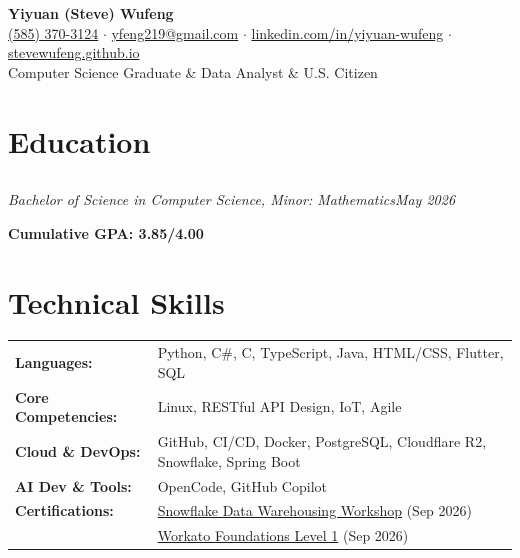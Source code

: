 \documentclass[11pt]{article}
\begin{document}
\begin{center}
  {\LARGE\textbf{Yiyuan (Steve) Wufeng}}\\[0.3em]
  \href{tel:+15853703124}{{\small (585) 370-3124}} $\cdot$
  \href{mailto:yfeng219@gmail.com}{{\small yfeng219@gmail.com}} $\cdot$
  \href{https://linkedin.com/in/yiyuan-wufeng/}{{\small linkedin.com/in/yiyuan-wufeng}} $\cdot$
  \href{https://stevewufeng.github.io}{{\small stevewufeng.github.io}}\\[0.01em]
  {\small Computer Science Graduate \& Data Analyst \& U.S. Citizen}\\[0.01em]
\end{center}

\section{Education}
\subsection{\texorpdfstring{}{Rochester Institute of Technology}}
\textit{Bachelor of Science in Computer Science, Minor: Mathematics}\hfill\textit{May 2026}\par
\vspace{-1.0em}
\textbf{Cumulative GPA: 3.85/4.00}\par

\section{Technical Skills}
\begin{tabular}{@{}p{4.5cm}@{}p{\dimexpr\textwidth-4.5cm\relax}@{}}
\textbf{Languages:}            & Python, C\#, C, TypeScript, Java, HTML/CSS, Flutter, SQL \\
\textbf{Core Competencies:}    & Linux, RESTful API Design, IoT, Agile \\
\textbf{Cloud \& DevOps:}      & GitHub, CI/CD, Docker, PostgreSQL, Cloudflare R2, Snowflake, Spring Boot\\
\textbf{AI Dev \& Tools:}      & OpenCode, GitHub Copilot \\
\textbf{Certifications:}       & \href{https://achieve.snowflake.com/debeceaf-c27a-47aa-8c9f-c43fdb8e2355}{Snowflake Data Warehousing Workshop} (Sep 2026) \\
                               & \href{https://credentials.workato.com/182fe530-8417-4f7b-94a9-810cc1ae5519\#acc.vBzriD6P}{Workato Foundations Level 1} (Sep 2026)
\end{tabular}
\end{document}
